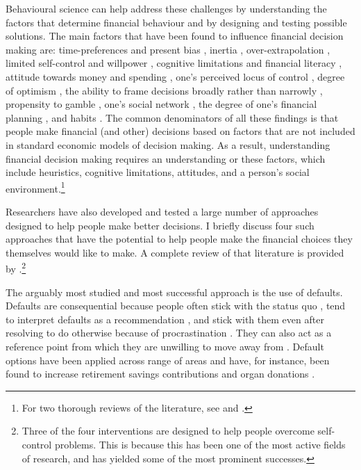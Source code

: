 Behavioural science can help address these challenges by understanding the
factors that determine financial behaviour and by designing and testing
possible solutions. The main factors that have been found to influence
financial decision making are: time-preferences and present bias
\citep{laibson1997golden, frederick2002time, read2018intertemporal,
ericson2019intertemporal, cohen2020measuring}, inertia
\citep{madrian2001power}, over-extrapolation \citep{choi2009reinforcement},
limited self-control and willpower \citep{thaler1981economic,
benhabib2005modeling, fudenberg2006dual, loewenstein2004animal,
gul2001temptation}, cognitive limitations and financial literacy
\citep{agarwal2009age, agarwal2013cognitive, korniotis2011older,
agarwal2010learning, fernandes2014financial, jorring2020financial}, attitude
towards money and spending \citep{rick2008tightwads, rick2011fatal}, one's
perceived locus of control \citep{perry2005control}, degree of optimism
\citep{puri2007optimism}, the ability to frame decisions broadly rather than
narrowly \citep{kumar2008decision}, propensity to gamble
\citep{kumar2009gambles}, one's social network \citep{bailey2018economic,
kuchler2021social}, the degree of one's financial planning
\citep{ameriks2003wealth}, and habits \citep{blumenstock2018defaults,
schaner2018persistent, de2013deposit}. The common denominators of all these findings is that people make financial (and other) decisions based on factors that are not included in standard economic models of decision making. As a result, understanding financial decision making requires an understanding or these factors, which include heuristics, cognitive limitations, attitudes, and a person's social environment.\footnote{For two thorough reviews of the
literature, see \citet{agarwal2017shapes} and \citet{greenberg2019financial}.}

Researchers have also developed and tested a large number of approaches
designed to help people make better decisions. I briefly discuss four such approaches
that have the potential to help people make the financial choices they
themselves would like to make. A complete review of that literature is provided
by \citet{duckworth2018beyond}.\footnote{Three of the four interventions are designed to help people overcome self-control problems. This is because this has been one of the most active fields of research, and has yielded some of the most prominent successes.}

The arguably most studied and most successful approach is the use of defaults. Defaults are consequential because people often stick
with the status quo \citep{samuelson1988status}, tend to
interpret defaults as a recommendation \citep{mckenzie2006recommendations}, and stick with them even after resolving to do otherwise because of procrastination \citep{carroll2009optimal, ericson2017interaction}. They can also act as a reference point from which they are unwilling to move away from \citep{johnson2003defaults, kahneman1979prospect}. Default options have been
applied across range of areas and have, for instance, been found to increase
retirement savings contributions \citep{thaler2004save, madrian2001power,
beshears2009importance} and organ donations \citep{johnson2003defaults,
gimbel2003presumed, abadie2006impact}.

